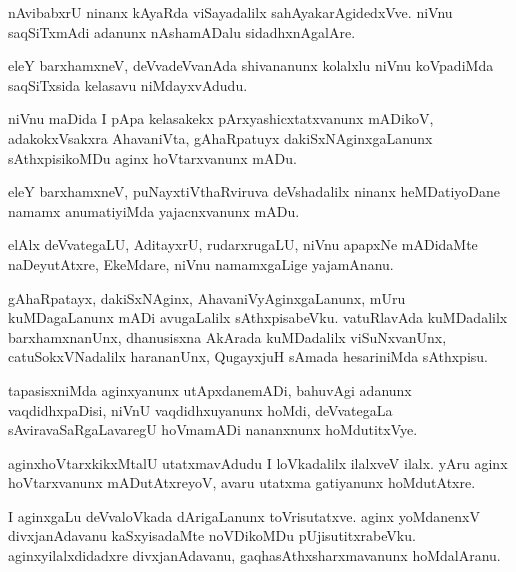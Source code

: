 \documentclass{article}
\begin{document}
\begin{mn}
nAvibabxrU ninanx kAyaRda viSayadalilx sahAyakarAgidedxVve. niVnu
saqSiTxmAdi adanunx nAshamADalu sidadhxnAgalAre.
\end{mn}

\begin{mn}%
eleY barxhamxneV, deVvadeVvanAda shivananunx kolalxlu niVnu koVpadiMda
saqSiTxsida kelasavu niMdayxvAdudu.
\end{mn}

\begin{mn}
niVnu maDida I pApa kelasakekx pArxyashicxtatxvanunx mADikoV,
adakokxVsakxra AhavaniVta, gAhaRpatuyx dakiSxNAginxgaLanunx
sAthxpisikoMDu aginx hoVtarxvanunx mADu.
\end{mn}

\begin{mn}
eleY barxhamxneV, puNayxtiVthaRviruva deVshadalilx ninanx
heMDatiyoDane namamx anumatiyiMda yajacnxvanunx mADu.
\end{mn}

\begin{mn}
elAlx deVvategaLU, AditayxrU, rudarxrugaLU, niVnu apapxNe mADidaMte
naDeyutAtxre, EkeMdare, niVnu namamxgaLige yajamAnanu.
\end{mn}

\begin{mn}%
gAhaRpatayx, dakiSxNAginx, AhavaniVyAginxgaLanunx, mUru kuMDagaLanunx
mADi avugaLalilx sAthxpisabeVku. vatuRlavAda kuMDadalilx
barxhamxnanUnx, dhanusisxna AkArada kuMDadalilx viSuNxvanUnx,
catuSokxVNadalilx harananUnx, QugayxjuH sAmada hesariniMda sAthxpisu.
\end{mn}

\begin{mn}%
tapasisxniMda aginxyanunx utApxdanemADi, bahuvAgi adanunx
vaqdidhxpaDisi, niVnU vaqdidhxuyanunx hoMdi, deVvategaLa
sAviravaSaRgaLavaregU hoVmamADi nananxnunx hoMdutitxVye.
\end{mn}

\begin{mn}
aginxhoVtarxkikxMtalU utatxmavAdudu I loVkadalilx ilalxveV ilalx. yAru
aginx hoVtarxvanunx mADutAtxreyoV, avaru utatxma gatiyanunx hoMdutAtxre.
\end{mn}

\begin{mn}
I aginxgaLu deVvaloVkada dArigaLanunx toVrisutatxve. aginx yoMdanenxV
divxjanAdavanu kaSxyisadaMte noVDikoMDu
pUjisutitxrabeVku. aginxyilalxdidadxre divxjanAdavanu,
gaqhasAthxsharxmavanunx hoMdalAranu.
\end{mn}
\end{document}

